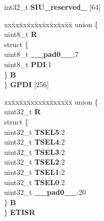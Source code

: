 \begin{DoxyCompactItemize}
\begin{tabbing}
\end{tabbing}\item 
\mbox{\label{structSIU__tag_a67461f63b4f41719af28c9f951cb365c}} 
int32\+\_\+t {\bfseries S\+I\+U\+\_\+reserved\+\_} \mbox{[}64\mbox{]}
\item 
\mbox{\label{structSIU__tag_a8e16bfb2de7758293436f169414fffe7}} 
\begin{tabbing}
xx\=xx\=xx\=xx\=xx\=xx\=xx\=xx\=xx\=\kill
union \{\\
\>uint8\_t {\bfseries R}\\
\>struct \{\\
\>\>uint8\_t {\bfseries \_\_pad0\_\_}:7\\
\>\>uint8\_t {\bfseries PDI}:1\\
\>\} {\bfseries B}\\
\} {\bfseries GPDI} \mbox{[}256\mbox{]}\\

\end{tabbing}\item 
\mbox{\label{structSIU__tag_a1341bfc464902091b9a041a2c3ec2e3c}} 
\begin{tabbing}
xx\=xx\=xx\=xx\=xx\=xx\=xx\=xx\=xx\=\kill
union \{\\
\>uint32\_t {\bfseries R}\\
\>struct \{\\
\>\>uint32\_t {\bfseries TSEL5}:2\\
\>\>uint32\_t {\bfseries TSEL4}:2\\
\>\>uint32\_t {\bfseries TSEL3}:2\\
\>\>uint32\_t {\bfseries TSEL2}:2\\
\>\>uint32\_t {\bfseries TSEL1}:2\\
\>\>uint32\_t {\bfseries TSEL0}:2\\
\>\>uint32\_t {\bfseries \_\_pad0\_\_}:20\\
\>\} {\bfseries B}\\
\} {\bfseries ETISR}\\


\end{tabbing}
\end{DoxyCompactItemize}
